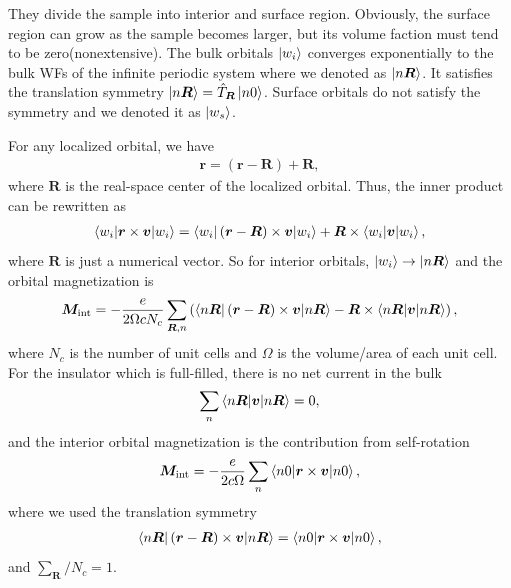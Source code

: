 \documentclass[12pt, oneside]{article}
\numberwithin{equation}{subsection}
\begin{document}
They divide the sample into interior and surface region. Obviously, the surface region can grow as the sample becomes larger, but its volume faction must tend to be zero(nonextensive). The bulk orbitals \(\ket{w_i}\) converges exponentially to the bulk WFs of the infinite periodic system where we denoted as \(\ket{n \bm{R }}\). It satisfies the translation symmetry \(\ket{n \bm{R }} = \hat{T}_{\bm{R}} \ket{n0}\). Surface orbitals do not satisfy the symmetry and we denoted it as \(\ket{w_s}\).

For any localized orbital, we have 
\begin{align}
	\bm{r} = \left(\bm{r} - \bm{R }	\right) + \bm{R},
\end{align}
where \(\bm{R}\) is the real-space center of the localized orbital. Thus, the inner product can be rewritten as 
\begin{align}
	\braket{w_i|\bm{r}\times\bm{v}|w_i} = \braket{w_i |\left(\bm{r} - \bm{R }	\right) \times \bm{v} | w_i } + \bm{R} \times \braket{w_i | \bm{v} | w_i},
\end{align}
where \(\bm{R}\) is just a numerical vector. So for interior orbitals, \(\ket{w_i} \rightarrow \ket{n \bm{R}}\) and the orbital magnetization is 
\begin{align}
	\bm{M}_{\mathrm{int}} = - \frac{e}{2 \Omega c N_c} \sum_{\bm{R},n} \left(\braket{n \bm{R} | \left(\bm{r} - \bm{R }	\right) \times \bm{v} |n \bm{R} } - \bm{R}  \times \braket{n\bm{R} | \bm{v} | n\bm{R}}\right),
\end{align}
where \(N_c\) is the number of unit cells and \(\Omega\) is the volume/area of each unit cell. For the insulator which is full-filled, there is no net current in the bulk
\begin{align}
	\sum_{n} \braket{n\bm{R} | \bm{v} | n\bm{R}} = 0,
\end{align} 
and the interior orbital magnetization is the contribution from self-rotation
\begin{align}
	\bm{M}_{\mathrm{int}} = - \frac{e}{2c \Omega} \sum_n \braket{n0 | \bm{r} \times \bm{v} | n0},
\end{align}
where we used the translation symmetry
\begin{align}
	 \braket{n \bm{R} | \left(\bm{r} - \bm{R }	\right) \times \bm{v} |n \bm{R} } = \braket{n0 | \bm{r} \times \bm{v} | n0},
\end{align}
and \(\sum_{\bm{R}}/N_c = 1\).
\end{document}
